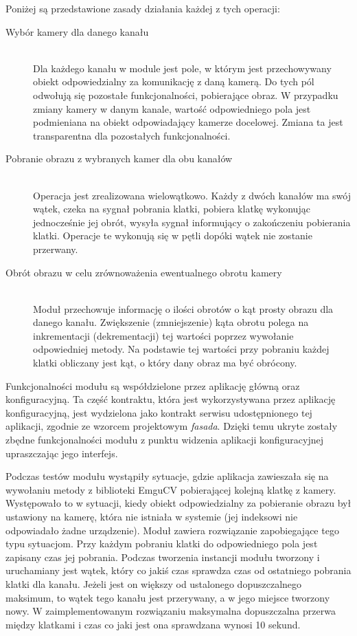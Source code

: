 \documentclass[a4paper,11pt,twoside]{report}
\theoremstyle{definition}
\begin{document}
Poniżej są przedstawione zasady działania każdej z tych operacji:
\begin{description}
\item [Wybór kamery dla danego kanału] \hfill \\
Dla każdego kanału w module jest pole, w którym jest przechowywany obiekt odpowiedzialny za komunikację z daną kamerą. Do tych pól odwołują się pozostałe funkcjonalności, pobierające obraz. W przypadku zmiany kamery w danym kanale, wartość odpowiedniego pola jest podmieniana na obiekt odpowiadający kamerze docelowej. Zmiana ta jest transparentna dla pozostałych funkcjonalności.
\item [Pobranie obrazu z wybranych kamer dla obu kanałów] \hfill \\
Operacja jest zrealizowana wielowątkowo. Każdy z dwóch kanałów ma swój wątek, czeka na sygnał pobrania klatki, pobiera klatkę wykonując jednocześnie jej obrót, wysyła sygnał informujący o zakończeniu pobierania klatki. Operacje te wykonują się w pętli dopóki wątek nie zostanie przerwany.
\item [Obrót obrazu w celu zrównoważenia ewentualnego obrotu kamery] \hfill \\
Moduł przechowuje informację o ilości obrotów o kąt prosty obrazu dla danego kanału. Zwiększenie (zmniejszenie) kąta obrotu polega na inkrementacji (dekrementacji) tej wartości poprzez wywołanie odpowiedniej metody. Na podstawie tej wartości przy pobraniu każdej klatki obliczany jest kąt, o który dany obraz ma być obrócony.
\end{description}

Funkcjonalności modułu są współdzielone przez aplikację główną oraz konfiguracyjną. Ta część kontraktu, która jest wykorzystywana przez aplikację konfiguracyjną, jest wydzielona jako kontrakt serwisu udostępnionego tej aplikacji, zgodnie ze wzorcem projektowym \textit{fasada}. Dzięki temu ukryte zostały zbędne funkcjonalności modułu z punktu widzenia aplikacji konfiguracyjnej upraszczając jego interfejs.

Podczas testów modułu wystąpiły sytuacje, gdzie aplikacja zawieszała się na wywołaniu metody z biblioteki EmguCV pobierającej kolejną klatkę z kamery. Występowało to w sytuacji, kiedy obiekt odpowiedzialny za pobieranie obrazu był ustawiony na kamerę, która nie istniała w systemie (jej indeksowi nie odpowiadało żadne urządzenie). Moduł zawiera rozwiązanie zapobiegające tego typu sytuacjom. Przy każdym pobraniu klatki do odpowiedniego pola jest zapisany czas jej pobrania. Podczas tworzenia instancji modułu tworzony i uruchamiany jest wątek, który co jakiś czas sprawdza czas od ostatniego pobrania klatki dla kanału. Jeżeli jest on większy od ustalonego dopuszczalnego maksimum, to wątek tego kanału jest przerywany, a w jego miejsce tworzony nowy. 
W zaimplementowanym rozwiązaniu maksymalna dopuszczalna przerwa między klatkami i czas co jaki jest ona sprawdzana wynosi 10 sekund.
\end{document}
